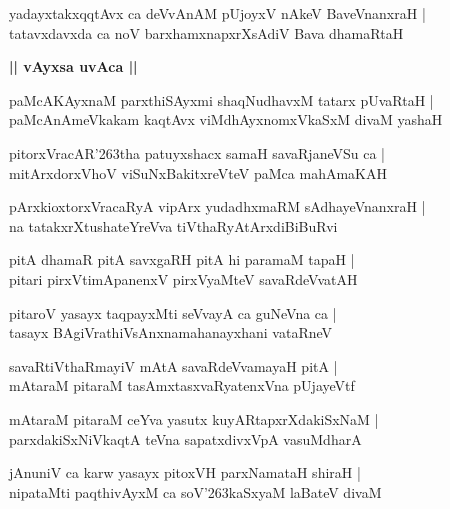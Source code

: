 \documentclass[twoside,12pt,openright]{book}
\def\S{\char'263}
\newcounter{shloka}[chapter]
\def\uvaca#1{\centerline{{\large\textbf{#1}}}}
\begin{document}
\begin{shloka}%
yadayxtakxqqtAvx ca deVvAnAM pUjoyxV nAkeV BaveVnanxraH |\\
tatavxdavxda ca noV barxhamxnapxrXsAdiV Bava dhamaRtaH 
\end{shloka}

\uvaca{|| vAyxsa uvAca ||}

\begin{shloka}%
paMcAKAyxnaM parxthiSAyxmi shaqNudhavxM tatarx pUvaRtaH |\\
paMcAnAmeVkakam kaqtAvx viMdhAyxnomxVkaSxM divaM yashaH 
\end{shloka}

\begin{shloka}%
pitorxVracAR\S tha patuyxshacx samaH savaRjaneVSu ca |\\
mitArxdorxVhoV viSuNxBakitxreVteV paMca mahAmaKAH 
\end{shloka}

\begin{shloka}%
pArxkioxtorxVracaRyA vipArx yudadhxmaRM sAdhayeVnanxraH |\\
na tatakxrXtushateYreVva tiVthaRyAtArxdiBiBuRvi
\end{shloka}

\begin{shloka}%
pitA dhamaR pitA savxgaRH pitA hi paramaM tapaH |\\
pitari pirxVtimApanenxV pirxVyaMteV savaRdeVvatAH 
\end{shloka}

\begin{shloka}%
pitaroV yasayx taqpayxMti seVvayA ca guNeVna ca |\\
tasayx BAgiVrathiVsAnxnamahanayxhani vataRneV
\end{shloka}

\begin{shloka}%
savaRtiVthaRmayiV mAtA savaRdeVvamayaH pitA |\\
mAtaraM pitaraM tasAmxtasxvaRyatenxVna pUjayeVtf
\end{shloka}

\begin{shloka}%
mAtaraM pitaraM ceYva yasutx kuyARtapxrXdakiSxNaM |\\
parxdakiSxNiVkaqtA teVna sapatxdivxVpA vasuMdharA 
\end{shloka}

\begin{shloka}%
jAnuniV ca karw yasayx pitoxVH parxNamataH shiraH |\\
nipataMti paqthivAyxM ca soV\S kaSxyaM laBateV divaM 
\end{shloka}
\end{document}
